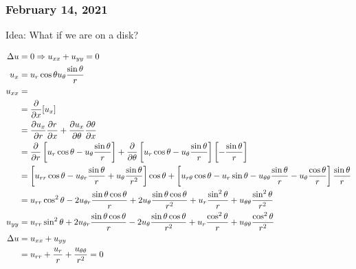 %

\subsubsection*{February 14, 2021}

Idea: What if we are on a disk?

\begin{align}
  \Delta u  & = 0 \Rightarrow u_{xx} + u_{yy} = 0\\
  u_x       & = u_r \cos \theta u_\theta \frac{\sin \theta}{r}\\
  u_{xx}    & = \\
  & = \frac{\partial}{\partial x} [u_x]\\
  & = \frac{\partial u_x}{\partial r} \frac{\partial r}{\partial x} + \frac{\partial u_x}{\partial \theta} \frac{\partial \theta}{\partial x}\\
  & =
  \frac{\partial}{\partial r}
  \left[u_r \cos \theta -u_\theta \frac{\sin \theta}{r}\right] +
  \frac{\partial}{\partial \theta}
  \left[ u_r \cos \theta - u_\theta \frac{\sin \theta}{r} \right]
  \left[ - \frac{\sin \theta}{r}\right]\\
  & =
  \left[ u_{rr} \cos \theta - u_{\theta r} \frac{\sin \theta}{r} + u_\theta \frac{\sin \theta}{r^2} \right] \cos \theta +
  \left[ u_{r \theta} \cos \theta - u_r \sin \theta - u_{\theta \theta} \frac{\sin \theta}{r} - u_\theta \frac{\cos \theta}{r} \right]
  \frac{\sin \theta}{r}\\
  & =
  u_{rr} \cos^2 \theta
  - 2 u_{\theta r} \frac{\sin \theta \cos \theta}{r}
  + 2 u_\theta \frac{\sin \theta \cos \theta}{r^2}
  + u_r \frac{\sin^2 \theta}{r} + u_{\theta \theta} \frac{\sin^2 \theta}{r^2}\\
  u_{yy} &
  = u_{rr} \sin^2 \theta
  + 2u_{\theta r} \frac{\sin \theta \cos \theta}{r}
  - 2u_\theta \frac{\sin \theta \cos \theta}{r^2}
  + u_r \frac{\cos^2 \theta}{r}
  + u_{\theta \theta} \frac{\cos^2 \theta}{r^2}\\
  \Delta u & = u_{xx} + u_{yy} \\ &
  = u_{rr}
  + \frac{u_r}{r}
  + \frac{u_{\theta \theta}}{r^2} = 0
\end{align}



